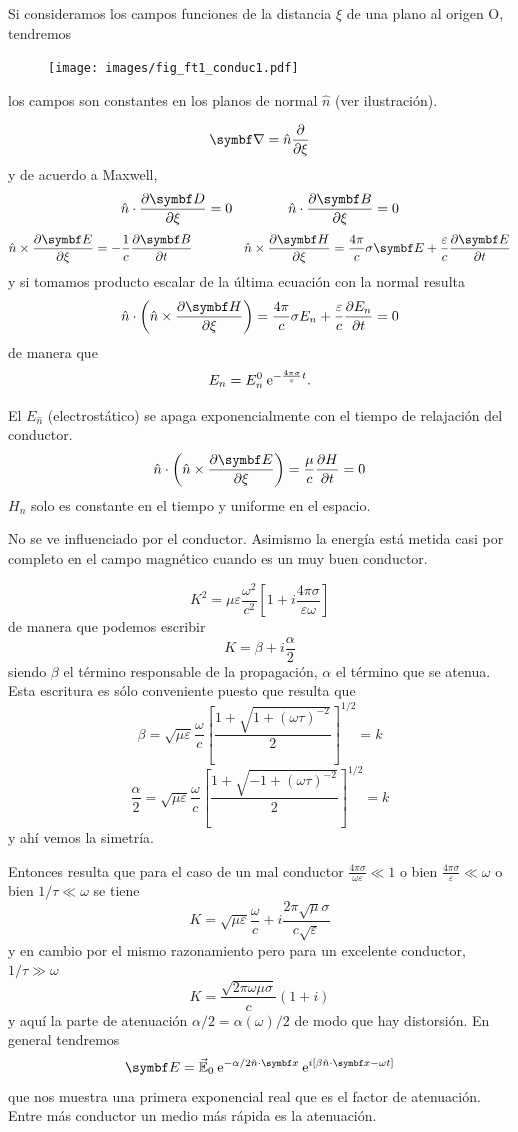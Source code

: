 \documentclass[10pt,oneside]{CBFT_book}
\begin{document}
Si consideramos los campos funciones de la distancia $\xi$ de una plano al origen O,
tendremos 

\begin{figure}[htb]
	\begin{center}
	\texttt{[image: images/fig\_ft1\_conduc1.pdf]}	 
	\end{center}
	\caption{}
\end{figure} 
los campos son constantes en los planos de normal $\hat{n}$ (ver ilustración).

\[
	\Nabla = \hat{n} \dpar{}{\xi}
\]
y de acuerdo a Maxwell,
\[
	\hat{n} \cdot \dpar{\vb{D}}{\xi} = 0 \qquad \qquad \hat{n} \cdot \dpar{\vb{B}}{\xi} = 0
\]
\[
	\hat{n} \times \dpar{\vb{E}}{\xi} = -\frac{1}{c} \dpar{\vb{B}}{t} \qquad \qquad
	\hat{n} \times \dpar{\vb{H}}{\xi} = \frac{4\pi}{c} \sigma \vb{E} + \frac{\varepsilon}{c} 
\dpar{\vb{E}}{t}
\]
y si tomamos producto escalar de la última ecuación con la normal resulta
\[
	\hat{n} \cdot \left( \hat{n} \times \dpar{\vb{H}}{\xi} \right) = 
		\frac{4\pi}{c} \sigma E_n + \frac{\varepsilon}{c} \dpar{E_n}{t} = 0 
\]
de manera que 
\[
	E_n = E_n^0 \:\mathrm{e}^{-\frac{4\pi\sigma}{\varepsilon} t}.
\]

El $E_{\hat{n}}$ (electrostático) se apaga exponencialmente con el tiempo de relajación
del conductor. 
\[
	\hat{n} \cdot \left( \hat{n} \times \dpar{\vb{E}}{\xi} \right) = \frac{\mu}{c} \dpar{H}{t} = 0
\]
$H_n$ solo es constante en el tiempo y uniforme en el espacio.

No se ve influenciado por el conductor. Asimismo la energía está metida casi por
completo en el campo magnético cuando es un muy buen conductor.

\[
	K^2 = \mu \varepsilon \frac{\omega^2}{c^2} \left[ 1 + i\frac{4\pi\sigma}{\varepsilon \omega} \right]
\]
de manera que podemos escribir
\[
	K = \beta + i \frac{\alpha}{2}
\]
siendo $\beta$ el término responsable de la propagación, $\alpha$ el término que se atenua. Esta escritura
es sólo conveniente puesto que resulta que 
\[
	\beta = \sqrt{ \mu \varepsilon }\frac{\omega}{c} 
	\left[ \frac{1 + \sqrt{ 1 + (\omega\tau )^{-2}}}{2}\right]^{1/2} = k
\]
\[
	\frac{\alpha}{2} = \sqrt{ \mu \varepsilon }\frac{\omega}{c} 
	\left[ \frac{1 + \sqrt{ -1 + (\omega\tau )^{-2}}}{2}\right]^{1/2} = k
\]
y ahí vemos la simetría.

Entonces resulta que para el caso de un mal conductor $ \frac{4\pi\sigma}{\omega \varepsilon} \ll 1 $ o bien 
$ \frac{4\pi\sigma}{\varepsilon} \ll \omega $ o bien $ 1/\tau \ll \omega $ se tiene 
\[
	K = \sqrt{ \mu \varepsilon }\frac{\omega}{c} + i \frac{2\pi\sqrt{\mu}\sigma}{c\sqrt{\varepsilon}}
\]
y en cambio por el mismo razonamiento pero para un excelente conductor, $1/\tau \gg \omega$
\[
	K = \frac{\sqrt{2\pi\omega\mu\sigma}}{c}( 1 + i )
\]
y aquí la parte de atenuación $\alpha/2 = \alpha(\omega)/2$ de modo que hay distorsión.
En general tendremos
\[
	\vb{E} = \vec{\mathbb{E}}_0 \euler^{-\alpha/2 \hat{n}\cdot\vb{x}} \euler^{i[\beta \hat{n}\cdot\vb{x} - 
\omega t]}
\]
que nos muestra una primera exponencial real que es el factor de atenuación. Entre más conductor un medio más
rápida es la atenuación.
\end{document}
